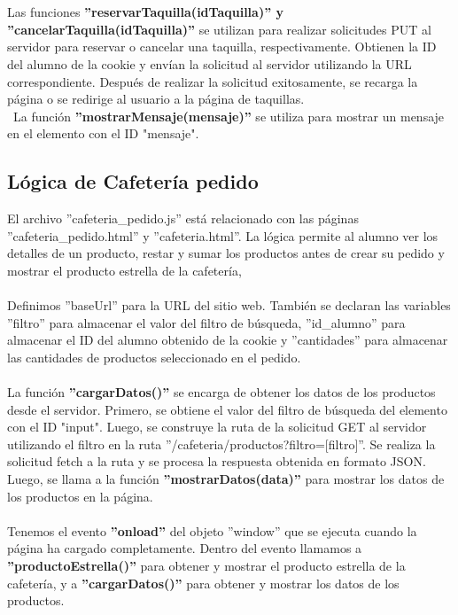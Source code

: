 \documentclass[12pt]{report}
\begin{document}
\\\\
Las funciones \textbf{''reservarTaquilla(idTaquilla)'' y ''cancelarTaquilla(idTaquilla)''} se utilizan para realizar solicitudes PUT al servidor para reservar o cancelar una taquilla, respectivamente. Obtienen la ID del alumno de la cookie y envían la solicitud al servidor utilizando la URL correspondiente. Después de realizar la solicitud exitosamente, se recarga la página o se redirige al usuario a la página de taquillas.
\\\
La función \textbf{''mostrarMensaje(mensaje)''} se utiliza para mostrar un mensaje en el elemento con el ID "mensaje".


\subsection{Lógica de Cafetería pedido}
El archivo ''cafeteria\_pedido.js'' está relacionado con las páginas ''cafeteria\_pedido.html'' y ''cafeteria.html''. La lógica permite al alumno ver los detalles de un producto, restar y sumar los productos antes de crear su pedido y mostrar el producto estrella de la cafetería,
\\\\
Definimos ''baseUrl'' para la URL del sitio web. También se declaran las variables ''filtro'' para almacenar el valor del filtro de búsqueda, ''id\_alumno'' para almacenar el ID del alumno obtenido de la cookie y ''cantidades'' para almacenar las cantidades de productos seleccionado en el pedido.
\\\\
La función \textbf{''cargarDatos()''} se encarga de obtener los datos de los productos desde el servidor. Primero, se obtiene el valor del filtro de búsqueda del elemento con el ID "input". Luego, se construye la ruta de la solicitud GET al servidor utilizando el filtro en la ruta ''/cafeteria/productos?filtro=[filtro]''. Se realiza la solicitud fetch a la ruta y se procesa la respuesta obtenida en formato JSON. Luego, se llama a la función \textbf{''mostrarDatos(data)''} para mostrar los datos de los productos en la página.\\\\
Tenemos el evento \textbf{''onload''} del objeto ''window'' que se ejecuta cuando la página ha cargado completamente. Dentro del evento llamamos a \textbf{''productoEstrella()''} para obtener y mostrar el producto estrella de la cafetería, y a \textbf{''cargarDatos()''} para obtener y mostrar los datos de los productos.
\end{document}
